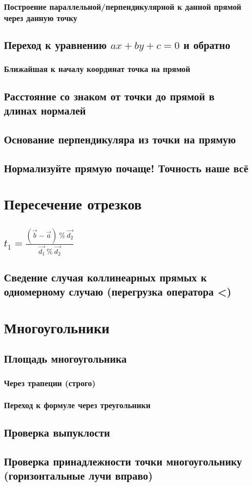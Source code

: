 \documentclass[a4paper,12pt]{article}
\def\v{\vec}
\begin{document}
       \subsubsection{Построение параллельной/перпендикулярной к данной прямой через данную точку}
     \subsection{Переход к уравнению $ax + by + c = 0$ и обратно}
       \subsubsection{Ближайшая к началу координат точка на прямой}
     \subsection{Расстояние со знаком от точки до прямой в длинах нормалей}
     \subsection{Основание перпендикуляра из точки на прямую}
     \subsection{Нормализуйте прямую почаще! Точность наше всё}
   \section{Пересечение отрезков}
     \subsection{$t_1 = \tfrac{(\v b - \v a)\ \%\ \v{d_2}}{\v{d_1}\ \%\ \v{d_2}}$}
     \subsection{Сведение случая коллинеарных прямых к одномерному случаю (перегрузка оператора <)}
   \section{Многоугольники}
     \subsection{Площадь многоугольника}
       \subsubsection{Через трапеции (строго)}
       \subsubsection{Переход к формуле через треугольники}
     \subsection{Проверка выпуклости}
     \subsection{Проверка принадлежности точки многоугольнику (горизонтальные лучи вправо)}
\end{document}
